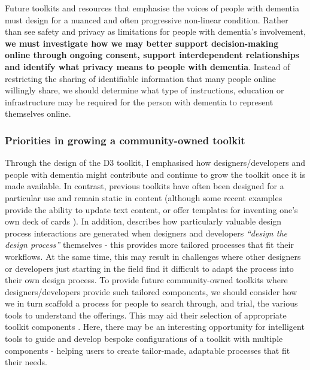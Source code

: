 Future toolkits and resources that emphasise the voices of people with dementia must design for a nuanced and often progressive non-linear condition. Rather than see safety and privacy as limitations for people with dementia's involvement, \textbf{we must investigate how we may better support decision-making online through ongoing consent, support interdependent relationships and identify what privacy means to people with dementia}. Instead of restricting the sharing of identifiable information that many people online willingly share, we should determine what type of instructions, education or infrastructure may be required for the person with dementia to represent themselves online. 

\subsubsection{Priorities in growing a community-owned toolkit}
Through the design of the D3 toolkit, I emphasised how designers/developers and people with dementia might contribute and continue to grow the toolkit once it is made available. In contrast, previous toolkits have often been designed for a particular use and remain static in content (although some recent examples provide the ability to update text content, or offer templates for inventing one's own deck of cards \citep{garcia2019designing,mora2017tiles}). In addition, \cite{mose2017understanding} describes how particularly valuable design process interactions are generated when designers and developers \textit{``design the design process''} themselves - this provides more tailored processes that fit their workflows. At the same time, this may result in challenges where other designers or developers just starting in the field find it difficult to adapt the process into their own design process. To provide future community-owned toolkits where designers/developers provide such tailored components, we should consider how we in turn scaffold a process for people to search through, and trial, the various tools to understand the offerings. This may aid their selection of appropriate toolkit components \citep{lee2021landscape}. Here, there may be an interesting opportunity for intelligent tools to guide and develop bespoke configurations of a toolkit with multiple components - helping users to create tailor-made, adaptable processes that fit their needs. 

